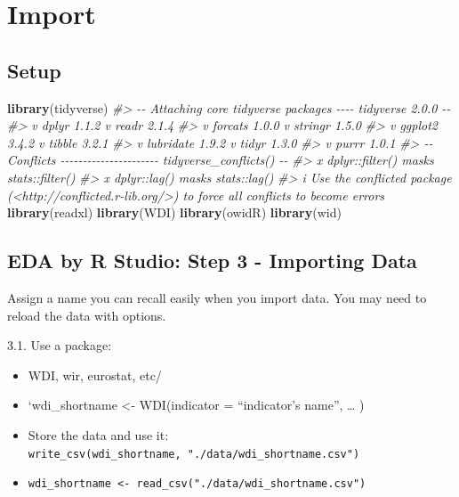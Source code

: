 \documentclass[
  xelatex, ja=standard]{bxjsbook}
\newenvironment{Shaded}{\begin{snugshade}}{\end{snugshade}}
\newcommand{\CommentTok}[1]{\textcolor[rgb]{0.56,0.35,0.01}{\textit{#1}}}
\newcommand{\FunctionTok}[1]{\textcolor[rgb]{0.13,0.29,0.53}{\textbf{#1}}}
\newcommand{\NormalTok}[1]{#1}
\providecommand{\tightlist}{%
  \setlength{\itemsep}{0pt}\setlength{\parskip}{0pt}}
\theoremstyle{definition}
\theoremstyle{definition}
\theoremstyle{definition}
\theoremstyle{definition}
\theoremstyle{remark}
\begin{document}
\hypertarget{import}{%
\chapter{Import}\label{import}}

\hypertarget{setup}{%
\section{Setup}\label{setup}}

\begin{Shaded}
\begin{Highlighting}[]
\FunctionTok{library}\NormalTok{(tidyverse)}
\CommentTok{\#\textgreater{} {-}{-} Attaching core tidyverse packages {-}{-}{-}{-} tidyverse 2.0.0 {-}{-}}
\CommentTok{\#\textgreater{} v dplyr     1.1.2     v readr     2.1.4}
\CommentTok{\#\textgreater{} v forcats   1.0.0     v stringr   1.5.0}
\CommentTok{\#\textgreater{} v ggplot2   3.4.2     v tibble    3.2.1}
\CommentTok{\#\textgreater{} v lubridate 1.9.2     v tidyr     1.3.0}
\CommentTok{\#\textgreater{} v purrr     1.0.1     }
\CommentTok{\#\textgreater{} {-}{-} Conflicts {-}{-}{-}{-}{-}{-}{-}{-}{-}{-}{-}{-}{-}{-}{-}{-}{-}{-}{-}{-}{-}{-} tidyverse\_conflicts() {-}{-}}
\CommentTok{\#\textgreater{} x dplyr::filter() masks stats::filter()}
\CommentTok{\#\textgreater{} x dplyr::lag()    masks stats::lag()}
\CommentTok{\#\textgreater{} i Use the conflicted package (\textless{}http://conflicted.r{-}lib.org/\textgreater{}) to force all conflicts to become errors}
\FunctionTok{library}\NormalTok{(readxl)}
\FunctionTok{library}\NormalTok{(WDI)}
\FunctionTok{library}\NormalTok{(owidR)}
\FunctionTok{library}\NormalTok{(wid)}
\end{Highlighting}
\end{Shaded}

\hypertarget{eda-by-r-studio-step-3---importing-data}{%
\section{EDA by R Studio: Step 3 - Importing Data}\label{eda-by-r-studio-step-3---importing-data}}

Assign a name you can recall easily when you import data. You may need to reload the data with options.

3.1. Use a package:

\begin{itemize}
\tightlist
\item
  WDI, wir, eurostat, etc/
\item
  `wdi\_shortname \textless- WDI(indicator = ``indicator's name'', \ldots{} )
\item
  Store the data and use it: \texttt{write\_csv(wdi\_shortname,\ "./data/wdi\_shortname.csv")}
\item
  \texttt{wdi\_shortname\ \textless{}-\ read\_csv("./data/wdi\_shortname.csv")}
\end{itemize}
\end{document}
